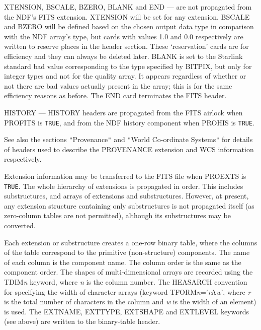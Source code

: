 \documentclass[twoside,11pt]{article}
\newcommand{\htmlref}[2]{#1}
\newcommand{\xref}[3]{#1}
\newcommand{\sstitem}{\item}
\newcommand{\sstitem}{\item}
\begin{document}
{{{{            \sstitem
            XTENSION, BSCALE, BZERO, BLANK and END --- are not propagated
              from the NDF's FITS extension.  XTENSION will be set for
              any extension.  BSCALE and BZERO will be defined based on
              the chosen output data type in comparison with the NDF
              array's type, but cards with values 1.0 and 0.0 respectively
              are written to reserve places in the header section.  These
              `reservation' cards are for efficiency and they can always
              be deleted later.  BLANK is set to the Starlink standard 
              \xref{bad value}{sun95}{se_badmasking} corresponding to the type
              specified by BITPIX, but only for integer types and not for the
              quality array.  It appears regardless of whether or not there are
              bad values actually present in the array; this is for the same
              efficiency reasons as before.  The END card terminates the FITS header.

            \sstitem
            HISTORY --- HISTORY headers are propagated from the FITS
              airlock when PROFITS is \texttt{TRUE}, and from the NDF
              history component when PROHIS is \texttt{TRUE}.

         }
         See also the sections
         \htmlref{\texttt{"}Provenance\texttt{"}}{ndf2fits_provenance} and
         \htmlref{\texttt{"}World Co-ordinate Systems\texttt{"}}{world_coordinate_systems}
         for details of headers used to describe the PROVENANCE extension 
         and WCS information respectively.

         \sstitem
         Extension information may be transferred to the FITS file when
         PROEXTS is \texttt{TRUE}.
         The whole hierarchy of extensions is propagated
         in order.  This includes substructures, and arrays of extensions
         and substructures.  However, at present, any extension structure
         containing only substructures is not propagated itself (as
         zero-column tables are not permitted), although its
         substructures may be converted.
 
         Each extension or substructure creates a one-row binary table,
         where the columns of the table correspond to the primitive
         (non-structure) components.  The name of each column is the
         component name.  The column order is the same as the component
         order.  The shapes of multi-dimensional arrays are recorded using
         the TDIM\textit{n} keyword, where \textit{n} is the column number.
         The HEASARCH convention for specifying the width of character arrays 
         (keyword TFORM\textit{n}='\textit{r}A\textit{w}', where \textit{r} is
         the total number of characters in the column and \textit{w} is the 
         width of an element) is used.  The EXTNAME,
         EXTTYPE, EXTSHAPE and EXTLEVEL keywords (see above) are written
         to the binary-table header.

}}}
\end{document}
